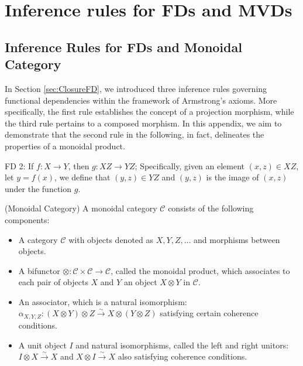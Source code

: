 \section{Inference rules for FDs and MVDs}
\label{sec:monoidal}

\subsection{Inference Rules for FDs and Monoidal Category}





In Section \ref{sec:ClosureFD}, we introduced three inference rules governing functional dependencies within the framework of Armstrong's axioms. More specifically, the first rule establishes the concept of a projection morphism, while the third rule pertains to a composed morphism. In this appendix, we aim to demonstrate that the second rule in the following, in fact, delineates the properties of a monoidal product.


FD 2: If $f: X \to Y$, then $g: XZ \to YZ$;  Specifically, given an element $(x,z) \in XZ$, let $y = f(x)$, we define that $(y,z) \in YZ$ and $(y,z)$ is the image of $(x,z)$ under the function $g$. 


\begin{definition}(Monoidal Category) A monoidal category $\mathcal{C}$ consists of the following components:

\begin{itemize}
    \item A category $\mathcal{C}$ with objects denoted as $X, Y, Z, \ldots$ and morphisms between objects.
    \item A bifunctor $\otimes: \mathcal{C} \times \mathcal{C} \to \mathcal{C}$, called the monoidal product, which associates to each pair of objects $X$ and $Y$ an object $X \otimes Y$ in $\mathcal{C}$.
    \item An associator, which is a natural isomorphism:
    $ \alpha_{X, Y, Z}: (X \otimes Y) \otimes Z \xrightarrow{\sim} X \otimes (Y \otimes Z)$
    satisfying certain coherence conditions.
    \item A unit object $I$ and natural isomorphisms, called the left and right unitors: $ I \otimes X \xrightarrow{\sim} X$ and $  X \otimes I \xrightarrow{\sim} X$
    also satisfying coherence conditions.
\end{itemize}
\end{definition}

